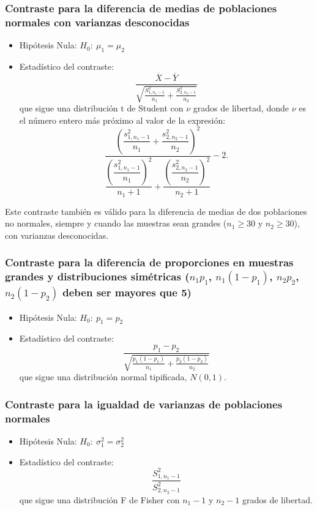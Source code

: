 \subsubsection{Contraste para la diferencia de medias de poblaciones normales con varianzas desconocidas}
\begin{itemize}
\item Hipótesis Nula: $H_0:\ \mu_1=\mu_2$
\item Estadístico del contraste:
\[
\frac{{\overline X  - \overline Y }}{{\sqrt {\frac{{S_{1,n_1-1} ^2}}{{n_1 }} + \frac{{S_{2,n_2-1} ^2 }}{{n_2 }}} }}
\]
que sigue una distribución t de Student con $\nu$ grados de libertad, donde $\nu$ es el número entero más próximo al
valor de la expresión:
\[
\dfrac{\left( \dfrac{s_{1,n_{1}-1}^{2}}{n_{1}}+\dfrac{s_{2,n_{2}-1}^{2}}{n_{2}}\right)
^{2}}{\dfrac{\left(\dfrac{s_{1,n_{1}-1}^{2}}{n_{1}}\right)^{2}}{n_{1}+1}+\dfrac{\left(
\dfrac{s_{2,n_{2}-1}^{2}}{n_{2}}\right) ^{2}}{n_{2}+1}}-2.
\]
\end{itemize}
Este contraste también es válido para la diferencia de medias de dos poblaciones no normales, siempre y cuando las
muestras sean grandes ($n_1\geq 30$ y $n_2\geq 30$), con varianzas desconocidas.

\subsubsection{Contraste para la diferencia de proporciones en muestras grandes y distribuciones simétricas ($n_1p_1$, $n_1(1-p_1)$, $n_2p_2$,
$n_2(1-p_2)$ deben ser mayores que 5)}
\begin{itemize}
\item Hipótesis Nula: $H_0:\ p_1=p_2$
\item Estadístico del contraste:
\[
\frac{{p_1  - p_2 }}{{\sqrt {\frac{{p_1 \left( {1 - p_1 }\right)}}{{n_1 }} + \frac{{p_2 \left( {1 - p_2 } \right)}}{{n_2}}} }}
\]
que sigue una distribución normal tipificada, $N(0,1)$.
\end{itemize}

\subsubsection{Contraste para la igualdad de varianzas de poblaciones normales}
\begin{itemize}
\item Hipótesis Nula: $H_0:\ \sigma_1^2=\sigma_2^2$
\item Estadístico del contraste:
\[
\frac{{S^2 _{1,n_1  - 1} }}{{S^2 _{2,n_2  - 1} }}
\]
que sigue una distribución F de Fisher con $n_1-1$ y $n_2-1$ grados de libertad.
\end{itemize}

